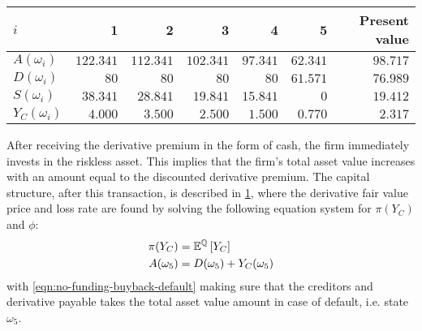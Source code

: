\documentclass[../main.tex]{subfiles}
\begin{document}
            \begin{table}[H]
                \centering
                \begin{tabular}{l|rrrrr||r}
                    $i$ & 1 & 2 & 3 & 4 & 5 & Present value \\
                    \hline
                    $A(\omega_{i})$ & $122.341$ & $112.341$ & $102.341$ & $97.341$ & $62.341$ & $98.717$ \\
                    $D(\omega_{i})$ & $80$ & $80$ & $80$ & $80$ & $61.571$ & $76.989$ \\
                    $S(\omega_{i})$ & $38.341$ & $28.841$ & $19.841$ & $15.841$ & $0$ & $19.412$ \\
                    $Y_C(\omega_{i})$ & $4.000$ & $3.500$ & $2.500$ & $1.500$ & $0.770$ & $2.317$ \\
                \end{tabular}
                \caption{}
                \label{tbl:example-no-funding-buyback}
            \end{table}

            After receiving the derivative premium in the form of cash, the firm immediately invests in the riskless asset. 
            This implies that the firm's total asset value increases with an amount equal to the discounted derivative premium. 
            The capital structure, after this transaction, is described in \cref{tbl:example-no-funding-buyback}, 
            where the derivative fair value price and loss rate are found
            by solving the following equation system for $\pi(Y_C)$ and $\phi$:
            \begin{align}
                \pi(Y_C) &= \mathbb{E}^{\mathbb{Q}}\left[Y_{C}\right]\\
                A(\omega_5) &= D(\omega_5) + Y_C(\omega_5)
                \label{eqn:no-funding-buyback-default}
            \end{align}
            with \cref{eqn:no-funding-buyback-default} making sure that the creditors and derivative payable
            takes the total asset value amount in case of default, i.e. state $\omega_5$.
\end{document}
